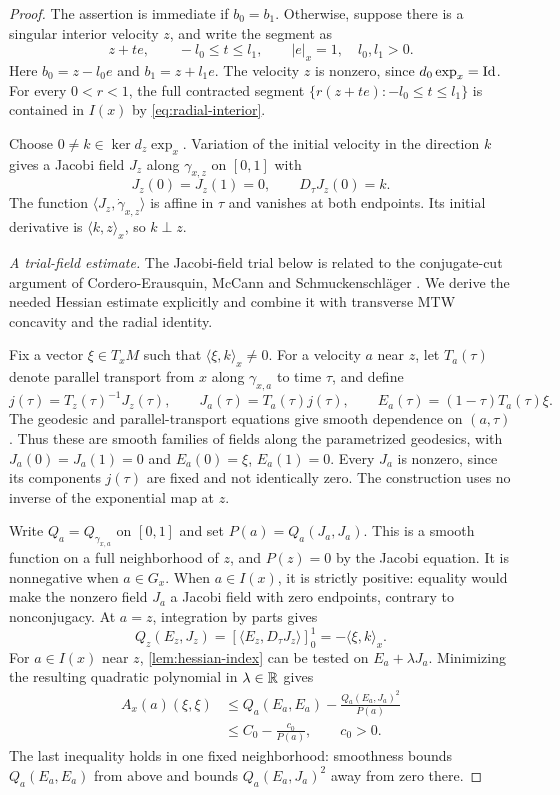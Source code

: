 \begin{proof}
The assertion is immediate if $b_0=b_1$.  Otherwise, suppose there
is a singular interior velocity $z$, and write the segment as
\[
 z+te,\qquad -l_0\leq t\leq l_1,
 \qquad |e|_x=1,\quad l_0,l_1>0.
\]
Here $b_0=z-l_0e$ and $b_1=z+l_1e$.  The velocity $z$ is nonzero,
since $d_0\exp_x=\mathrm{Id}$.
For every $0<r<1$, the full contracted segment
$\{r(z+te):-l_0\leq t\leq l_1\}$ is contained in $I(x)$ by
\eqref{eq:radial-interior}.

Choose $0\ne k\in\ker d_z\exp_x$.  Variation of the initial
velocity in the direction $k$ gives a Jacobi field $J_z$ along
$\gamma_{x,z}$ on $[0,1]$ with
\[
 J_z(0)=J_z(1)=0,\qquad D_\tau J_z(0)=k.
\]
The function $\langle J_z,\dot\gamma_{x,z}\rangle$ is affine in
$\tau$ and vanishes at both endpoints.  Its initial derivative is
$\langle k,z\rangle_x$, so $k\perp z$.

\medskip\noindent
\emph{A trial-field estimate.}
The Jacobi-field trial below is related to the conjugate-cut argument of
Cordero-Erausquin, McCann and Schmuckenschl\"ager
\cite[Proposition~2.5]{CMS2001}. We derive the needed Hessian estimate
explicitly and combine it with transverse MTW concavity and the radial
identity.

Fix a vector $\xi\in T_xM$ such that $\langle\xi,k\rangle_x\ne0$.
For a velocity $a$ near $z$, let $T_a(\tau)$ denote parallel
transport from $x$ along $\gamma_{x,a}$ to time $\tau$, and define
\[
 j(\tau)=T_z(\tau)^{-1}J_z(\tau),\qquad
 J_a(\tau)=T_a(\tau)j(\tau),\qquad
 E_a(\tau)=(1-\tau)T_a(\tau)\xi.
\]
The geodesic and parallel-transport equations give smooth dependence
on $(a,\tau)$.  Thus these are smooth families of fields along the
parametrized geodesics, with
$J_a(0)=J_a(1)=0$ and $E_a(0)=\xi$, $E_a(1)=0$.
Every $J_a$ is nonzero, since its components $j(\tau)$ are fixed and
not identically zero.  The construction uses no inverse of the
exponential map at $z$.

Write $Q_a=Q_{\gamma_{x,a}}$ on $[0,1]$ and set
$P(a)=Q_a(J_a,J_a)$.  This is a smooth function on a full
neighborhood of $z$, and $P(z)=0$ by the Jacobi equation.
It is nonnegative when $a\in G_x$.  When $a\in I(x)$, it is
strictly positive: equality would make the nonzero field $J_a$ a
Jacobi field with zero endpoints, contrary to nonconjugacy.
At $a=z$, integration by parts gives
\[
 Q_z(E_z,J_z)
 =[\langle E_z,D_\tau J_z\rangle]_0^1
 =-\langle\xi,k\rangle_x.
\]
For $a\in I(x)$ near $z$, \cref{lem:hessian-index} can be tested
on $E_a+\lambda J_a$.  Minimizing the resulting quadratic polynomial
in $\lambda\in\mathbb R$ gives
\begin{equation}
 \begin{split}
 A_x(a)(\xi,\xi)
 &\leq Q_a(E_a,E_a)
       -\frac{Q_a(E_a,J_a)^2}{P(a)}\\
 &\leq C_0-\frac{c_0}{P(a)},
 \qquad c_0>0.
 \end{split}
 \label{eq:trial-hessian}
\end{equation}
The last inequality holds in one fixed neighborhood: smoothness
bounds $Q_a(E_a,E_a)$ from above and bounds $Q_a(E_a,J_a)^2$
away from zero there.


\end{proof}
